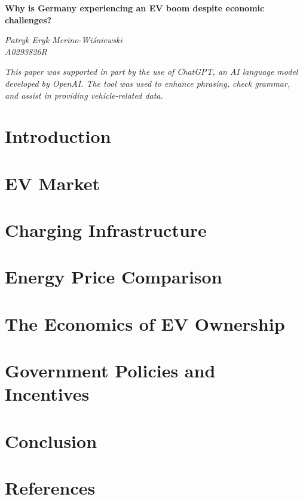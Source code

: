 \documentclass[10pt]{article}
\begin{document}
\pagestyle{fancy}


\begin{center}
	\Large{\textbf{Why is Germany experiencing an EV boom despite economic challenges?}}
	\normalsize

	\textit{Patryk Eryk Merino-Wi{\'s}niewski}\\
	\vspace{0.1cm}
	\textit{A0293826R}
	\medskip
	\normalsize
\end{center}

\begin{multicols}{2}
	\small\textit{This paper was supported in part by the use of ChatGPT, an AI language model developed by OpenAI. The tool was used to enhance phrasing, check grammar, and assist in providing vehicle-related data.
	}\normalsize 
	\section{Introduction} \label{sec: intro}
		

	\section{EV Market}\label{sec: mark}
		

	\section{Charging Infrastructure}\label{sec: charg}
		

	\section{Energy Price Comparison}\label{sec: ener}
		

	\section{The Economics of EV Ownership}\label{sec: owner}
		
		
	\section{Government Policies and Incentives}\label{sec: gover}
		

	\section{Conclusion}\label{sec: conc}
		
		
	\section*{References}


\printbibliography[type=article, title={Articles}]

\printbibliography[type=online, title={Online Resources}]

\clearpage
\end{multicols}
\end{document}
